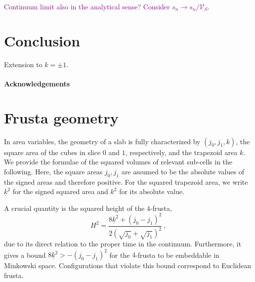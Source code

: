 \documentclass[amsmath,amssymb,aps,twocolumn,superscriptaddress,nofootinbib]{revtex4-1}
\newcommand{\caj}[1]{\textcolor{purple}{#1}}
\begin{document}
\caj{Continuum limit also in the analytical sense? Consider $s_n\rightarrow s_n/\mathcal{V}_S$.}







\section{Conclusion}

Extension to $k = \pm 1$. 

\paragraph*{Acknowledgements}  %

\appendix
\section{Frusta geometry}\label{app:frusta}

In area variables, the geometry of a slab is fully characterized by $(j_0, j_1,k)$, the square area of the cubes in slice $0$ and $1$, respectively, and the trapezoid area $k$.
We provide the formulae of the squared volumes of relevant sub-cells in the following.
Here, the square areas $j_0,j_1$ are assumed to be the absolute values of the signed areas and therefore positive.
For the squared trapezoid area, we write $\underline{k}^2$ for the signed squared area and $k^2$ for its absolute value.

A crucial quantity is the squared height of the $4$-frusta,
%
\begin{equation}\label{eq:height}
H^2 = \frac{8\underline{k}^2 + (j_0-j_1)^2}{2(\sqrt{j_0} + \sqrt{j_1})^2}\,,
\end{equation}
%
due to its direct relation to the proper time in the continuum.
Furthermore, it gives a bound $8\underline{k}^2 > -(j_0 - j_1)^2$ for the $4$-frusta to be embeddable in Minkowski space.
Configurations that violate this bound correspond to Euclidean frusta.
\end{document}
